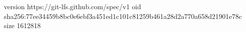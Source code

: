 version https://git-lfs.github.com/spec/v1
oid sha256:77ee34459b8bc0e6ebf3a451ed1c101c81259b461a28d2a770a658d21901e78c
size 1612818
